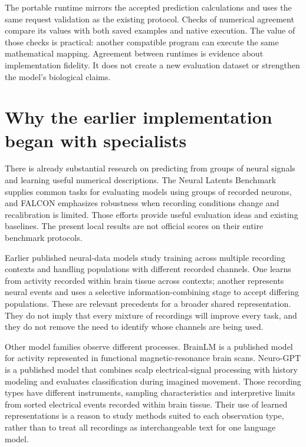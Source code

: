 The portable runtime mirrors the accepted prediction calculations and uses the same request validation as the existing protocol. Checks of numerical agreement compare its values with both saved examples and native execution. The value of those checks is practical: another compatible program can execute the same mathematical mapping. Agreement between runtimes is evidence about implementation fidelity. It does not create a new evaluation dataset or strengthen the model's biological claims.

\section{Why the earlier implementation began with specialists}

There is already substantial research on predicting from groups of neural signals and learning useful numerical descriptions. The Neural Latents Benchmark supplies common tasks for evaluating models using groups of recorded neurons, and FALCON emphasizes robustness when recording conditions change and recalibration is limited. Those efforts provide useful evaluation ideas and existing baselines. The present local results are not official scores on their entire benchmark protocols.\cite{nlb2021,falcon2024}

Earlier published neural-data models study training across multiple recording contexts and handling populations with different recorded channels. One learns from activity recorded within brain tissue across contexts; another represents neural events and uses a selective information-combining stage to accept differing populations. These are relevant precedents for a broader shared representation. They do not imply that every mixture of recordings will improve every task, and they do not remove the need to identify whose channels are being used.\cite{ndt2_2023,poyo2023}

Other model families observe different processes. BrainLM is a published model for activity represented in functional magnetic-resonance brain scans. Neuro-GPT is a published model that combines scalp electrical-signal processing with history modeling and evaluates classification during imagined movement. Those recording types have different instruments, sampling characteristics and interpretive limits from sorted electrical events recorded within brain tissue. Their use of learned representations is a reason to study methods suited to each observation type, rather than to treat all recordings as interchangeable text for one language model.\cite{brainlm2023,neurogpt2024}

